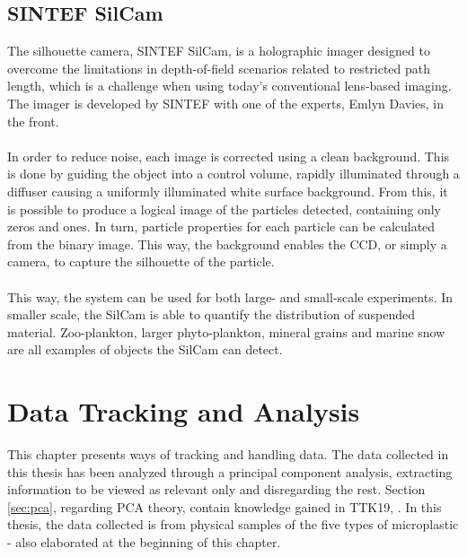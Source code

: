 \section{SINTEF SilCam}
The silhouette camera, SINTEF SilCam, is a holographic imager designed to overcome the limitations in depth-of-field scenarios related to restricted path length, which is a challenge when using today's conventional lens-based imaging. The imager is developed by SINTEF with one of the experts, Emlyn Davies, in the front. \cite{davies_2018}
\\\\
In order to reduce noise, each image is corrected using a clean background. This is done by guiding the object into a control volume, rapidly illuminated through a diffuser causing a uniformly illuminated white surface background. From this, it is possible to produce a logical image of the particles detected, containing only zeros and ones. In turn, particle properties for each particle can be calculated from the binary image.
This way, the background enables the CCD, or simply a camera, to capture the silhouette of the particle.
\\\\
This way, the system can be used for both large- and small-scale experiments. In smaller scale, the SilCam is able to quantify the distribution of suspended material. Zoo-plankton, larger phyto-plankton, mineral grains and marine snow are all examples of objects the SilCam can detect. 



\chapter{Data Tracking and Analysis} \label{cap:theory3}
This chapter presents ways of tracking and handling data. The data collected in this thesis has been analyzed through a principal component analysis, extracting information to be viewed as relevant only and disregarding the rest. Section \ref{sec:pca}, regarding PCA theory, contain knowledge gained in TTK19, \cite{westad2018}. In this thesis, the data collected is from physical samples of the five types of microplastic - also elaborated at the beginning of this chapter.

